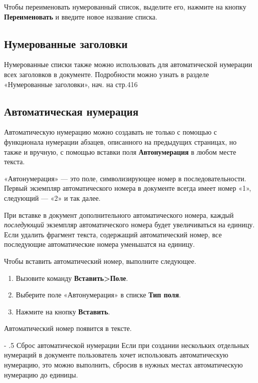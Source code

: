 \documentclass[a4paper,10pt]{article}
\makeatletter
\renewcommand\paragraph{%
   \@startsection{paragraph}{4}{0mm}%
      {-\baselineskip}%
      {.5\baselineskip}%
      {\normalfont\normalsize\bfseries}}
\makeatother
\begin{document}
Чтобы переименовать нумерованный список, выделите его, нажмите на кнопку \textbf{Переименовать} и введите новое название списка.

\subsection{Нумерованные заголовки}
Нумерованные списки также можно использовать для автоматической нумерации всех заголовков в документе. Подробности можно узнать в разделе «Нумерованные заголовки», нач. на стр.416

\subsection{Автоматическая нумерация}
Автоматическую нумерацию можно создавать не только с помощью с функционала нумерации абзацев, описанного на предыдущих страницах, но также и вручную, с помощью вставки поля \textbf{Автонумерация} в любом месте текста.

«Автонумерация» --- это поле, символизирующее номер в последовательности. Первый экземпляр автоматического номера в документе всегда имеет номер «1», следующий --- «2» и так далее.

При вставке в документ дополнительного автоматического номера, каждый \textit{последующий} экземпляр автоматического номера будет увеличиваться на единицу. Если удалить фрагмент текста, содержащий автоматический номер, все последующие автоматические номера уменьшатся на единицу. 

Чтобы вставить автоматический номер, выполните следующее.
\begin{enumerate}
 \item Вызовите команду \textbf{Вставить>Поле}.
 \item Выберите поле «Автонумерация» в списке \textbf{Тип поля}.
 \item Нажмите на кнопку \textbf{Вставить}.
\end{enumerate}

Автоматический номер появится в тексте.

\paragraph{Сброс автоматической нумерации}
Если при создании нескольких отдельных нумераций в документе пользователь хочет использовать автоматическую нумерацию, это можно выполнить, сбросив в нужных местах автоматическую нумерацию до единицы.
\end{document}

